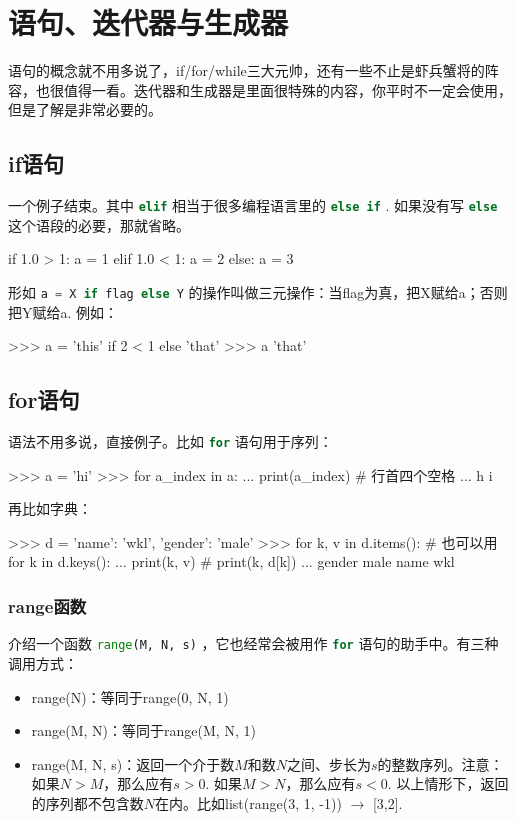 \documentclass[a4paper,12pt]{report}
\newcommand{\pyline}[1]{{ \lstinline[language=Python, basicstyle=\ttfamily]{#1} }}
\newcommand{\python}{{\ttfamily{Python}}}
\newenvironment{feai}{\begin{itemize}[font=\bfseries]}
    {\end{itemize}}
\begin{document}
\chapter{语句、迭代器与生成器}
语句的概念就不用多说了，if/for/while三大元帅，还有一些不止是虾兵蟹将的阵容，也很值得一看。迭代器和生成器是\python 里面很特殊的内容，你平时不一定会使用，但是了解是非常必要的。

\section{if语句}
一个例子结束。其中\pyline{elif}相当于很多编程语言里的\pyline{else if}. 如果没有写\pyline{else}这个语段的必要，那就省略。
\begin{py}
if 1.0 > 1:
    a = 1
elif 1.0 < 1:
    a = 2
else: 
    a = 3
\end{py}

形如\pyline{a = X if flag else Y}的操作叫做三元操作：当flag为真，把X赋给a；否则把Y赋给a. 例如：
\begin{py}
>>> a = 'this' if 2 < 1 else 'that'
>>> a
'that'
\end{py}

\section{for语句}
\label{sec:for}
语法不用多说，直接例子。比如\pyline{for}语句用于序列：
\begin{py}
>>> a = 'hi'
>>> for a_index in a:   
...     print(a_index)  # 行首四个空格
...
h
i
\end{py}

再比如字典：
\begin{py}
>>> d = {'name': 'wkl', 'gender': 'male'}
>>> for k, v in d.items():  # 也可以用for k in d.keys():
...     print(k, v)         #             print(k, d[k])
...
gender male
name wkl
\end{py}

\subsection{range函数}
介绍一个函数\pyline{range(M, N, s)}，它也经常会被用作\pyline{for}语句的助手中。有三种调用方式：
\begin{feai}
\item range(N)：等同于range(0, N, 1)
\item range(M, N)：等同于range(M, N, 1)
\item range(M, N, s)：返回一个介于数$M$和数$N$之间、步长为$s$的整数序列。注意：如果$N>M$，那么应有$s>0$. 如果$M>N$，那么应有$s<0$. 以上情形下，返回的序列都不包含数$N$在内。比如list(range(3, 1, -1)) $\rightarrow$ [3,2]. 
\end{feai}
\end{document}
